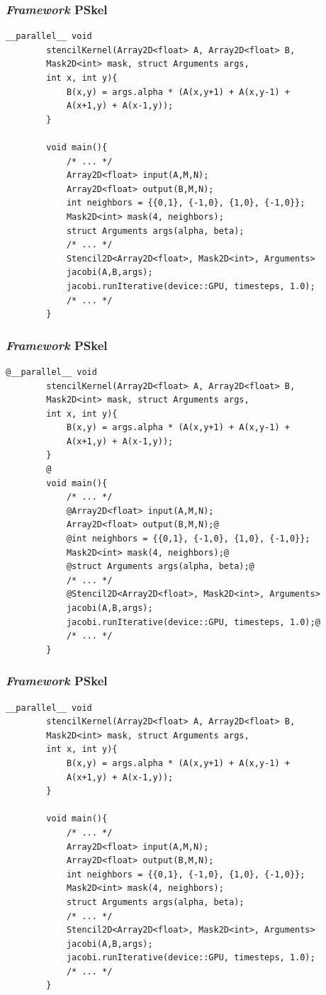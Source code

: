 \documentclass[xcolor={table}]{beamer}
\begin{document}
\begin{frame}[fragile]
    \frametitle{\textit{Framework} PSkel}
    \begin{lstlisting}[style=highlight, gobble=4]
        __parallel__ void
        stencilKernel(Array2D<float> A, Array2D<float> B,
        Mask2D<int> mask, struct Arguments args,
        int x, int y){
            B(x,y) = args.alpha * (A(x,y+1) + A(x,y-1) +
            A(x+1,y) + A(x-1,y));
        }

        void main(){
            /* ... */
            Array2D<float> input(A,M,N);
            Array2D<float> output(B,M,N);
            int neighbors = {{0,1}, {-1,0}, {1,0}, {-1,0}};
            Mask2D<int> mask(4, neighbors);
            struct Arguments args(alpha, beta);
            /* ... */
            Stencil2D<Array2D<float>, Mask2D<int>, Arguments>
            jacobi(A,B,args);
            jacobi.runIterative(device::GPU, timesteps, 1.0);
            /* ... */
        }
    \end{lstlisting}
\end{frame}

\begin{frame}[fragile]
    \frametitle{\textit{Framework} PSkel}
    \begin{lstlisting}[style=base, gobble=4]
        @__parallel__ void
        stencilKernel(Array2D<float> A, Array2D<float> B,
        Mask2D<int> mask, struct Arguments args,
        int x, int y){
            B(x,y) = args.alpha * (A(x,y+1) + A(x,y-1) +
            A(x+1,y) + A(x-1,y));
        }
        @
        void main(){
            /* ... */
            @Array2D<float> input(A,M,N);
            Array2D<float> output(B,M,N);@
            @int neighbors = {{0,1}, {-1,0}, {1,0}, {-1,0}};
            Mask2D<int> mask(4, neighbors);@
            @struct Arguments args(alpha, beta);@
            /* ... */
            @Stencil2D<Array2D<float>, Mask2D<int>, Arguments>
            jacobi(A,B,args);
            jacobi.runIterative(device::GPU, timesteps, 1.0);@
            /* ... */
        }
    \end{lstlisting}
\end{frame}


\begin{frame}[fragile]
    \frametitle{\textit{Framework} PSkel}
    \begin{lstlisting}[style=highlight, gobble=4]
        __parallel__ void
        stencilKernel(Array2D<float> A, Array2D<float> B,
        Mask2D<int> mask, struct Arguments args,
        int x, int y){
            B(x,y) = args.alpha * (A(x,y+1) + A(x,y-1) +
            A(x+1,y) + A(x-1,y));
        }

        void main(){
            /* ... */
            Array2D<float> input(A,M,N);
            Array2D<float> output(B,M,N);
            int neighbors = {{0,1}, {-1,0}, {1,0}, {-1,0}};
            Mask2D<int> mask(4, neighbors);
            struct Arguments args(alpha, beta);
            /* ... */
            Stencil2D<Array2D<float>, Mask2D<int>, Arguments>
            jacobi(A,B,args);
            jacobi.runIterative(device::GPU, timesteps, 1.0);
            /* ... */
        }
    \end{lstlisting}
\end{frame}
\end{document}
